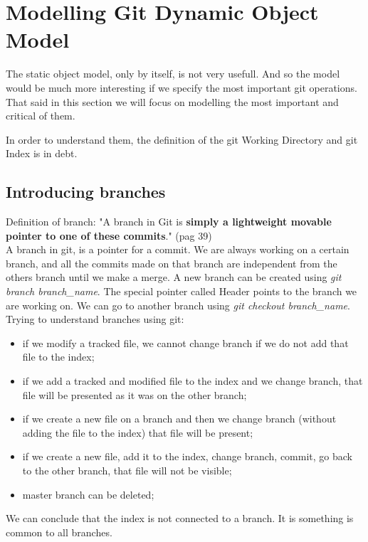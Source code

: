 \section {Modelling Git Dynamic Object Model}
The static object model, only by itself, 
is not very usefull. And so
the model would be much more interesting if we specify 
the most important git operations. That said in this
section we will focus on modelling the most important
and critical of them. \par

In order to understand them, the definition
of the git Working Directory and git Index is in debt.

\subsection{Introducing branches}
Definition of branch: "A branch in Git is {\bf simply a lightweight movable pointer to one of these commits}." \cite{progit} (pag 39)\\
A branch in git, is a pointer for a commit. We are always working on a certain branch, and all the commits made on that branch are independent from the others branch until we make a merge. A new branch can be created using \emph{git branch branch\_name}. The special pointer called Header points to the branch we are working on. We can go to another branch using \emph{git checkout branch\_name}.\\



Trying to understand branches using git:
\begin{itemize}
   \item if we modify a tracked file, we cannot change branch if we do not add that file to the index;
   \item if we add a tracked and modified file to the index and we change branch, that file will be presented as it was on the other branch;
   \item if we create a new file on a branch and then we change branch (without adding the file to the index) that file will be present;
   \item if we create a new file, add it to the index, change branch, commit, go back to the other branch, that file will not be visible;
   \item master branch can be deleted;
\end{itemize}

We can conclude that the index is not connected to a branch. It is something is common to all branches.
